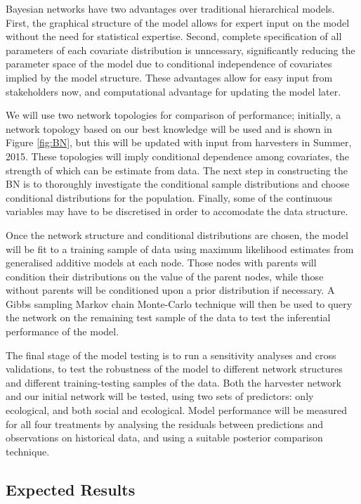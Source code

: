 \documentclass{article}
\begin{document}
Bayesian networks have two advantages over traditional hierarchical models. First, the graphical structure of the model allows for expert input on the model without the need for statistical expertise. Second, complete specification of all parameters of each covariate distribution is unncessary, significantly reducing the parameter space of the model due to conditional independence of covariates implied by the model structure. These advantages allow for easy input from stakeholders now, and computational advantage for updating the model later.

We will use two network topologies for comparison of performance; initially, a network topology based on our best knowledge will be used and is shown in Figure \ref{fig:BN}, but this will be updated with input from harvesters in Summer, 2015. These topologies will imply conditional dependence among covariates, the strength of which can be estimate from data. The next step in constructing the BN is to thoroughly investigate the conditional sample distributions and choose conditional distributions for the population. Finally, some of the continuous variables may have to be discretised in order to accomodate the data structure.

Once the network structure and conditional distributions are chosen, the model will be fit to a training sample of data using maximum likelihood estimates from generalised additive models at each node. Those nodes with parents will condition their distributions on the value of the parent nodes, while those without parents will be conditioned upon a prior distribution if necessary. A Gibbs sampling Markov chain Monte-Carlo technique will then be used to query the network on the remaining test sample of the data to test the inferential performance of the model.

The final stage of the model testing is to run a sensitivity analyses and cross validations, to test the robustness of the model to different network structures and different training-testing samples of the data. Both the harvester network and our initial network will be tested, using two sets of predictors: only ecological, and both social and ecological. Model performance will be measured for all four treatments by analysing the residuals between predictions and observations on historical data, and using a suitable posterior comparison technique.


\subsection{Expected Results}
\end{document}
